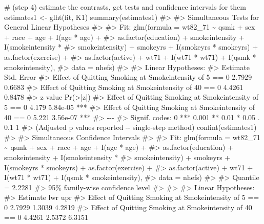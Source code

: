 \documentclass[
  10pt,
  a4paper,
]{book}
\newenvironment{Shaded}{\begin{snugshade}}{\end{snugshade}}
\newcommand{\CommentTok}[1]{\textcolor[rgb]{0.37,0.37,0.37}{#1}}
\newcommand{\FunctionTok}[1]{\textcolor[rgb]{0.28,0.35,0.67}{#1}}
\newcommand{\NormalTok}[1]{\textcolor[rgb]{0.00,0.46,0.62}{#1}}
\newcommand{\OtherTok}[1]{\textcolor[rgb]{0.00,0.46,0.62}{#1}}
\begin{document}
\begin{Shaded}
\begin{Highlighting}[]
\CommentTok{\# (step 4) estimate the contrasts, get tests and confidence intervals for them}
\NormalTok{estimates1 }\OtherTok{\textless{}{-}} \FunctionTok{glht}\NormalTok{(fit, K1)}
  \FunctionTok{summary}\NormalTok{(estimates1)}
\CommentTok{\#\textgreater{} }
\CommentTok{\#\textgreater{}   Simultaneous Tests for General Linear Hypotheses}
\CommentTok{\#\textgreater{} }
\CommentTok{\#\textgreater{} Fit: glm(formula = wt82\_71 \textasciitilde{} qsmk + sex + race + age + I(age * age) + }
\CommentTok{\#\textgreater{}     as.factor(education) + smokeintensity + I(smokeintensity * }
\CommentTok{\#\textgreater{}     smokeintensity) + smokeyrs + I(smokeyrs * smokeyrs) + as.factor(exercise) + }
\CommentTok{\#\textgreater{}     as.factor(active) + wt71 + I(wt71 * wt71) + I(qsmk * smokeintensity), }
\CommentTok{\#\textgreater{}     data = nhefs)}
\CommentTok{\#\textgreater{} }
\CommentTok{\#\textgreater{} Linear Hypotheses:}
\CommentTok{\#\textgreater{}                                                         Estimate Std. Error}
\CommentTok{\#\textgreater{} Effect of Quitting Smoking at Smokeintensity of 5 == 0    2.7929     0.6683}
\CommentTok{\#\textgreater{} Effect of Quitting Smoking at Smokeintensity of 40 == 0   4.4261     0.8478}
\CommentTok{\#\textgreater{}                                                         z value Pr(\textgreater{}|z|)    }
\CommentTok{\#\textgreater{} Effect of Quitting Smoking at Smokeintensity of 5 == 0    4.179 5.84e{-}05 ***}
\CommentTok{\#\textgreater{} Effect of Quitting Smoking at Smokeintensity of 40 == 0   5.221 3.56e{-}07 ***}
\CommentTok{\#\textgreater{} {-}{-}{-}}
\CommentTok{\#\textgreater{} Signif. codes:  0 \textquotesingle{}***\textquotesingle{} 0.001 \textquotesingle{}**\textquotesingle{} 0.01 \textquotesingle{}*\textquotesingle{} 0.05 \textquotesingle{}.\textquotesingle{} 0.1 \textquotesingle{} \textquotesingle{} 1}
\CommentTok{\#\textgreater{} (Adjusted p values reported {-}{-} single{-}step method)}
  \FunctionTok{confint}\NormalTok{(estimates1)}
\CommentTok{\#\textgreater{} }
\CommentTok{\#\textgreater{}   Simultaneous Confidence Intervals}
\CommentTok{\#\textgreater{} }
\CommentTok{\#\textgreater{} Fit: glm(formula = wt82\_71 \textasciitilde{} qsmk + sex + race + age + I(age * age) + }
\CommentTok{\#\textgreater{}     as.factor(education) + smokeintensity + I(smokeintensity * }
\CommentTok{\#\textgreater{}     smokeintensity) + smokeyrs + I(smokeyrs * smokeyrs) + as.factor(exercise) + }
\CommentTok{\#\textgreater{}     as.factor(active) + wt71 + I(wt71 * wt71) + I(qsmk * smokeintensity), }
\CommentTok{\#\textgreater{}     data = nhefs)}
\CommentTok{\#\textgreater{} }
\CommentTok{\#\textgreater{} Quantile = 2.2281}
\CommentTok{\#\textgreater{} 95\% family{-}wise confidence level}
\CommentTok{\#\textgreater{}  }
\CommentTok{\#\textgreater{} }
\CommentTok{\#\textgreater{} Linear Hypotheses:}
\CommentTok{\#\textgreater{}                                                         Estimate lwr    upr   }
\CommentTok{\#\textgreater{} Effect of Quitting Smoking at Smokeintensity of 5 == 0  2.7929   1.3039 4.2819}
\CommentTok{\#\textgreater{} Effect of Quitting Smoking at Smokeintensity of 40 == 0 4.4261   2.5372 6.3151}


\end{Highlighting}
\end{Shaded}
\end{document}
